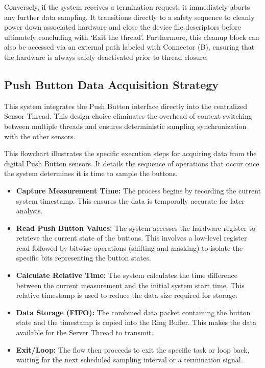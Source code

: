 Conversely, if the system receives a termination request, it immediately
aborts any further data sampling. It transitions directly to a safety sequence
to cleanly power down associated hardware and close the device file descriptors
before ultimately concluding with `Exit the thread'. Furthermore, this cleanup
block can also be accessed via an external path labeled with Connector (B),
ensuring that the hardware is always safely deactivated prior to thread
closure.

\subsection{Push Button Data Acquisition Strategy}
This system integrates the Push Button interface directly into the centralized Sensor Thread. This design choice eliminates the overhead of context switching between multiple threads and ensures deterministic sampling synchronization with the other sensors.

This flowchart illustrates the specific execution steps for acquiring data
from the digital Push Button sensors. It details the sequence of operations
that occur once the system determines it is time to sample the buttons.

\begin{itemize}
    \item \textbf{Capture Measurement Time:} The process begins by recording
    the current system timestamp. This ensures the data is temporally accurate
    for later analysis.

    \item \textbf{Read Push Button Values:} The system accesses the hardware
    register to retrieve the current state of the buttons. This involves a
    low-level register read followed by bitwise operations (shifting and
    masking) to isolate the specific bits representing the button states.

    \item \textbf{Calculate Relative Time:} The system calculates the time
    difference between the current measurement and the initial system start
    time. This relative timestamp is used to reduce the data size required for
    storage.

    \item \textbf{Data Storage (FIFO):} The combined data packet containing
    the button state and the timestamp is copied into the Ring Buffer. This
    makes the data available for the Server Thread to transmit.

    \item \textbf{Exit/Loop:} The flow then proceeds to exit the specific task
    or loop back, waiting for the next scheduled sampling interval or a
    termination signal.
\end{itemize}

